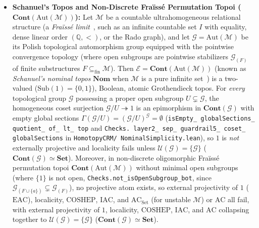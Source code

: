 \begin{itemize}
  \item \textbf{Schanuel's Topos and Non-Discrete Fraïssé Permutation Topoi ($\mathbf{Cont}(\mathrm{Aut}(\mathcal{M}))$):} Let $\mathcal{M}$ be a countable ultrahomogeneous relational structure (a \emph{Fraïssé limit}~\cite[\S 7.1]{Hodges93}, such as an infinite countable set $I$ with equality, dense linear order $(\mathbb{Q}, <)$, or the Rado graph), and let $\mathcal{G} = \mathrm{Aut}(\mathcal{M})$ be its Polish topological automorphism group equipped with the pointwise convergence topology (where open subgroups are pointwise stabilizers $\mathcal{G}_{(F)}$ of finite substructures $F \subseteq_{\mathrm{fin}} \mathcal{M}$). Then $\mathcal{E} = \mathbf{Cont}(\mathrm{Aut}(\mathcal{M}))$ (known as \emph{Schanuel's nominal topos} $\mathbf{Nom}$ when $\mathcal{M}$ is a pure infinite set~\cite[Ch.~III, \S 9]{MacLaneMoerdijk92}) is a two-valued ($\mathrm{Sub}(1) = \{0, 1\}$), Boolean, atomic Grothendieck topos. For \emph{every} topological group $\mathcal{G}$ possessing a proper open subgroup $U \subsetneq \mathcal{G}$, the homogeneous coset surjection $\mathcal{G}/U \twoheadrightarrow 1$ is an epimorphism in $\mathbf{Cont}(\mathcal{G})$ with empty global sections $\Gamma(\mathcal{G}/U) = (\mathcal{G}/U)^{\mathcal{G}} = \emptyset$ (\texttt{isEmpty\_ globalSections\_ quotient\_ of\_ lt\_ top} and \texttt{Checks. layer2\_ sep\_ guardrail5\_ coset\_ globalSections} in \texttt{HomotopyCRM/ NominalSimplicity.lean}), so $1$ is \emph{not} externally projective and localicity fails unless $\mathcal{U}(\mathcal{G}) = \{\mathcal{G}\}$ ($\mathbf{Cont}(\mathcal{G}) \simeq \mathbf{Set}$). Moreover, in non-discrete oligomorphic Fraïssé permutation topoi $\mathbf{Cont}(\mathrm{Aut}(\mathcal{M}))$ without minimal open subgroups (where $\{1\}$ is not open, \texttt{Checks.not\_isOpenSubgroup\_bot}, since $\mathcal{G}_{(F \cup \{a\})} \subsetneq \mathcal{G}_{(F)}$), no projective atom exists, so external projectivity of $1$ ($\mathrm{EAC}$), localicity, $\mathrm{COSHEP}$, $\mathrm{IAC}$, and $\mathrm{AC}_{\mathrm{Set}}$ (for unstable $\mathcal{M}$) or $\mathrm{AC}$ all fail, with external projectivity of $1$, localicity, $\mathrm{COSHEP}$, $\mathrm{IAC}$, and $\mathrm{AC}$ collapsing together to $\mathcal{U}(\mathcal{G}) = \{\mathcal{G}\}$ ($\mathbf{Cont}(\mathcal{G}) \simeq \mathbf{Set}$).

\end{itemize}

